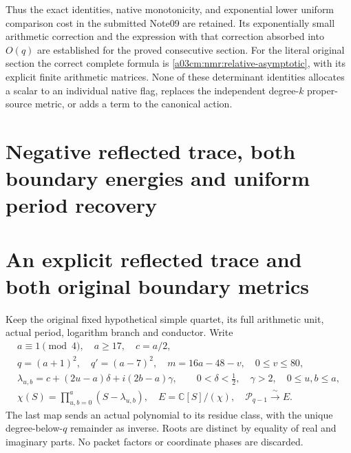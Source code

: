 Thus the exact identities, native monotonicity, and exponential lower
uniform comparison cost in the submitted Note09 are retained.
Its exponentially small arithmetic correction and the expression
with that correction absorbed into $O(q)$ are established for the
proved consecutive section. For the literal original section the
correct complete formula is \eqref{a03cm:nmr:relative-asymptotic}, with
its explicit finite arithmetic matrices. None of these determinant identities allocates
a scalar to an individual native flag, replaces the independent
degree-$k$ proper-source metric, or adds a term to the canonical action.



\endgroup

\clearpage
\begingroup


\setcounter{equation}{0}
\renewcommand{\theequation}{A03RP.\arabic{equation}}
\section*{Negative reflected trace, both boundary energies and uniform period recovery}
\begingroup
\section{An explicit reflected trace and both original boundary metrics}
\label{a03rp:sec:RBV}

Keep the original fixed hypothetical simple quartet, its full arithmetic
unit, actual period, logarithm branch and conductor. Write
\[
\begin{gathered}
a\equiv1\pmod4,\quad a\ge17,\quad c=a/2,\\
q=(a+1)^2,\quad q'=(a-7)^2,\quad m=16a-48-v,\quad0\le v\le80,\\
\lambda_{u,b}=c+(2u-a)\delta+i(2b-a)\gamma,\qquad
0<\delta<\tfrac12,\quad\gamma>2,\quad0\le u,b\le a,\\
\chi(S)=\prod_{u,b=0}^a(S-\lambda_{u,b}),\quad
E=\mathbb C[S]/(\chi),\quad
\mathcal P_{q-1}\xrightarrow{\ \sim\ }E .
\end{gathered}\tag{RBV1}
\]
The last map sends an actual polynomial to its residue class, with
the unique degree-below-$q$ remainder as inverse. Roots are distinct
by equality of real and imaginary parts. No packet factors or coordinate
phases are discarded.

